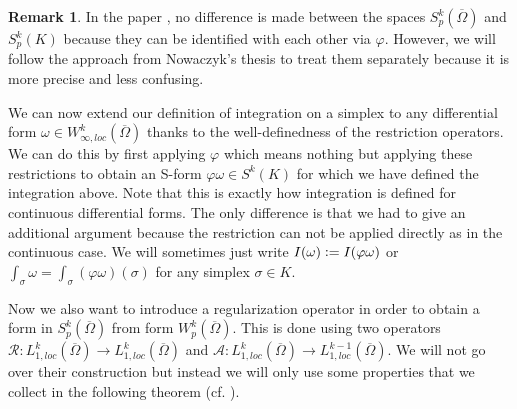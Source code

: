 \documentclass[12pt,a4paper]{article}
\numberwithin{equation}{subsection}
\numberwithin{lemma}{subsection}
\theoremstyle{definition}
\newtheorem{remark}[lemma]{Remark}
\newcommand{\aop}{\mathscr{A}}
\newcommand{\omegabar}{\overline{\Omega}}
\newcommand{\rop}{\mathscr{R}} %
\begin{document}
\begin{remark} \label{rem:local_construction_regularization}
    In the paper \cite{goldshtein}, no difference is made between the spaces 
    $S^k_p(\omegabar)$ and $S^k_p(K)$ because they can be identified with each 
    other via $\varphi$. However, we will follow the approach from Nowaczyk's 
    thesis \cite{nowaczyk} to treat them separately because it is more precise 
    and less confusing.
\end{remark}

We can now extend our definition of integration on a simplex to any differential
form $\omega \in W_{\infty,loc}^k(\omegabar)$ thanks to the 
well-definedness of the restriction operators. We can do this by first 
applying $\varphi$ which means nothing but applying these restrictions to obtain
an S-form $\varphi \omega \in S^k(K)$ for which we have defined the integration 
above. Note that this is exactly how integration is defined for continuous 
differential forms. The only difference is that we had to give an additional 
argument because the restriction can not be applied directly as in the 
continuous case. We will sometimes just write $I(\omega) \vcentcolon= 
I(\varphi\omega)$ or $\int_\sigma \omega = \int_\sigma (\varphi\omega)(\sigma)$
for any simplex $\sigma \in K$.

Now we also want to introduce a regularization operator in order to 
obtain 
a form in $S^k_p(\omegabar)$ from form $W^k_p(\omegabar)$. 
This is done 
using two operators $\rop: L^k_{1,loc}(\omegabar) \rightarrow 
L^k_{1,loc}(\omegabar)$ and $\aop: L^k_{1,loc}(\omegabar) \rightarrow 
L^{k-1}_{1,loc}(\omegabar)$.
We will not go over their construction but instead we will only use
some properties that we collect in the following theorem
(cf. \cite[Thm.2]{goldshtein}).
\end{document}
